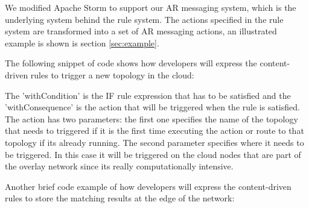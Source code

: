 \noindent We modified Apache Storm to support our AR messaging system, which is the underlying system behind the rule system. The actions specified in the rule system are transformed into a set of  AR messaging actions, an illustrated example is shown is section \ref{sec:example}. 

The following snippet of code shows how developers will express the content-driven rules to trigger a new topology in the cloud:


The 'withCondition' is the IF rule expression that has to be satisfied and the 'withConsequence' is the action that will be triggered when the rule is satisfied. The action has two parameters: the first one specifies the name of the topology that needs to triggered if it is the first time executing the action or route to that topology if its already running. The second parameter specifies where it needs to be triggered. In this case it will be triggered on the cloud nodes that are part of the overlay network since its really computationally intensive. 

Another brief code example of how developers will express the content-driven rules to store the matching results at the edge of the network:


